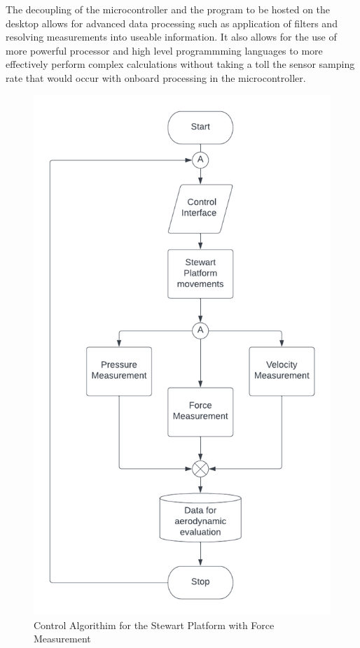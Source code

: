 The decoupling of the microcontroller and the program to be hosted on the desktop allows for advanced data processing such as application of filters and resolving measurements into useable information. It also allows for the use of more powerful processor and high level programmming languages to more effectively perform complex calculations without taking a toll the sensor samping rate that would occur with onboard processing in the microcontroller.
\newpage
\begin{center}
	\begin{figure}[!h]
	\centering
	\includegraphics[width=0.7\linewidth]{Figures/Fig14}
	\caption[Control Algorithim]{Control Algorithim for the Stewart Platform with Force Measurement}
	\end{figure}
\end{center}